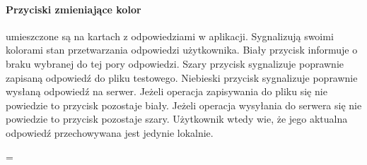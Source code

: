 \documentclass[eng]{mgr}
\newenvironment{absolutelynopagebreak}
{\par\nobreak\vfil\penalty0\vfilneg
	\vtop\bgroup}
{\par\xdef\tpd{\the\prevdepth}\egroup
	\prevdepth=\tpd}
\begin{document}
				\begin{absolutelynopagebreak}
				\paragraph{Przyciski zmieniające kolor}
				umieszczone są na kartach z odpowiedziami w aplikacji. Sygnalizują swoimi kolorami stan przetwarzania odpowiedzi użytkownika. Biały przycisk informuje o braku wybranej do tej pory odpowiedzi. Szary przycisk sygnalizuje poprawnie zapisaną odpowiedź do pliku testowego. Niebieski przycisk sygnalizuje poprawnie wysłaną odpowiedź na serwer.
				Jeżeli operacja zapisywania do pliku się nie powiedzie to przycisk pozostaje biały.
				Jeżeli operacja wysyłania do serwera się nie powiedzie to przycisk pozostaje szary. Użytkownik wtedy wie, że jego aktualna odpowiedź przechowywana jest jedynie lokalnie.\\
				\end{absolutelynopagebreak}
				
\end{document}
